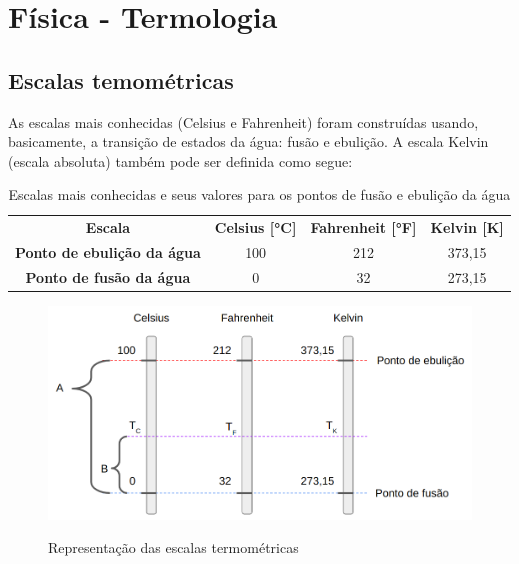 
\chapter{Física - Termologia}

\section{Escalas temométricas}
As escalas mais conhecidas (Celsius e Fahrenheit) foram construídas usando, basicamente, a transição de estados da água: fusão e ebulição. A escala Kelvin (escala absoluta) também pode ser definida como segue:

\begin{table}[!h]
    \centering
    \caption{Escalas mais conhecidas e seus valores para os pontos de fusão e ebulição da água}
    \vspace{.5cm}
    \label{tab:my-table}
    \begin{tabular}{cccc}
    \textbf{Escala}                    & \textbf{Celsius {[}°C{]}} & \textbf{Fahrenheit {[}°F{]}} & \textbf{Kelvin {[}K{]}} \\
    \textbf{Ponto de ebulição da água} & 100                       & 212                          & 373,15                  \\
    \textbf{Ponto de fusão da água}    & 0                         & 32                           & 273,15                 
    \end{tabular}
\end{table}


\begin{figure}[!h]
    \caption{Representação das escalas termométricas}
    
    \centering %
    \includegraphics[width=12cm]{Pictures/FISICA_EM/TERMOLOGIA/escalas_termometros.png} %
    \label{figura:qualquernome}
\end{figure}


